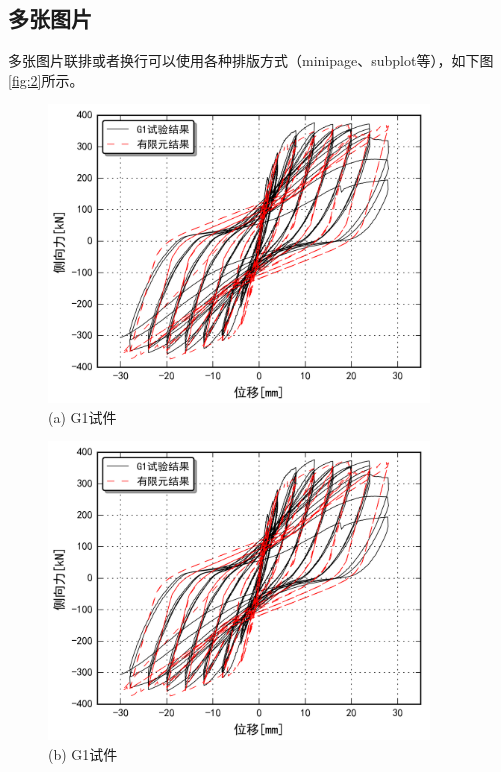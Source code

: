 \documentclass{bjtuthesis}
\begin{document}
\subsection{多张图片}
多张图片联排或者换行可以使用各种排版方式（minipage、subplot等），如下图\ref{fig:2}所示。
\begin{figure}
    \centering
    \begin{minipage}[t]{0.48\textwidth}
        \centering
        \includegraphics[width=0.9\textwidth]{pic/G1.png}\\
        {(a) G1试件}
    \end{minipage}
    \begin{minipage}[t]{0.48\textwidth}
        \centering
        \includegraphics[width=0.9\textwidth]{pic/G1.png}\\
        {(b) G1试件}
    \end{minipage}
\end{figure}
\end{document}
